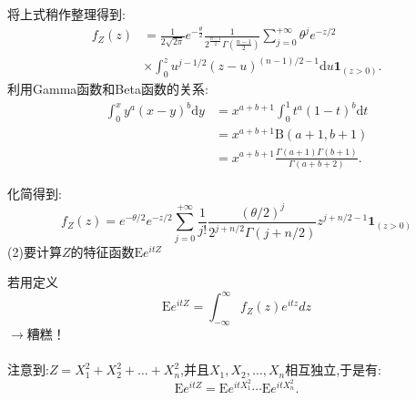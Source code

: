 	\begin{frame}
		将上式稍作整理得到:
		\begin{equation}
			\begin{split}
				f_Z(z) &= 
					\frac{1}{2\sqrt{2\pi}}e^{-\frac{\theta}{2}}\frac{1}{2^{\frac{n-1}{2}}\Gamma(\frac{n-1}{2})}\sum_{j=0}^{+\infty}\theta^je^{-z/2} \\
					&\times\int_{0}^{z}u^{j-1/2}(z-u)^{(n-1)/2-1}\mathrm{d}u \bm{1}_{(z>0)}.
			\end{split}
		\end{equation}
		利用Gamma函数和Beta函数的关系:
		\begin{equation}
			\begin{split}
					\int_{0}^{x}y^a(x-y)^b\mathrm{d}y &= x^{a+b+1}\int_{0}^{1}t^a(1-t)^b\mathrm{d}t \\
					&= x^{a+b+1}\mathrm{B}(a+1,b+1) \\
					&= x^{a+b+1}\frac{\Gamma(a+1)\Gamma(b+1)}{\Gamma(a+b+2)}.
			\end{split}
		\end{equation}
	\end{frame}

	\begin{frame}
		化简得到:
		\begin{equation}
			f_Z(z) =e^{-\theta/2}e^{-z/2}\sum_{j=0}^{+\infty}\frac{1}{j!}\frac{(\theta/2)^j}{2^{j+n/2}\Gamma(j+n/2)}z^{j+n/2-1}\bm{1}_{(z>0)}
		\end{equation}
		(2)要计算$Z$的特征函数$\mathrm{E}e^{itZ}$
		
		若用定义
		\begin{equation}
			\mathrm{E}e^{itZ} = \int_{-\infty}^{\infty}f_Z(z)e^{itz}dz
		\end{equation}
		$\longrightarrow$糟糕！
		\\ \hspace*{\fill} \\%
		注意到:$Z=X_1^2+X_2^2+\dots+X_n^2$,并且$X_1,X_2,\dots,X_n$相互独立,于是有:
		\begin{equation}
			\mathrm{E}e^{itZ} = \mathrm{E}e^{itX_1^2}\cdots\mathrm{E}e^{itX_n^2}.
		\end{equation}
	\end{frame}

